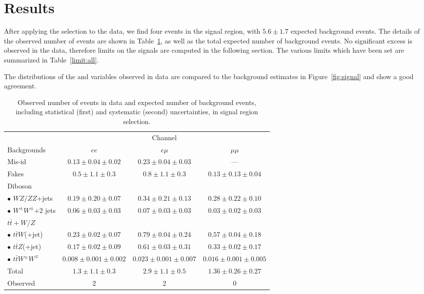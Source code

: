 \section{Results}\label{sect:results}
After applying the selection to the data, we find four events in the signal region, with $5.6\pm1.7$ expected background events. 
The details of the observed number of events are shown in Table~\ref{finalyield}, as well as the total expected number of background events. 
No significant excess is observed in the data, therefore limits on the signals are computed in the following section.
The various limits which have been set are summarized in Table~\ref{limit:all}.

The distributions of the \met{} and \HT{} variables observed in data are compared to the background estimates in Figure~\ref{fig:signal} and show a good agreement.

\begin{table}[t]
  \begin{center}
    \caption{Observed number of events in data and expected number of background events, including statistical (first) and systematic (second) uncertainties, in signal region selection.}\label{finalyield}
    \begin{tabular}{l|c|c|c}
      \hline\hline
       & \multicolumn{3}{c}{Channel} \\
      \cline{2-4}
      Backgrounds & $ee$ & $e\mu$ & $\mu\mu$ \\
      \hline
      Mis-id & $0.13\pm 0.04 \pm 0.02$ & $0.23\pm 0.04 \pm 0.03$ & --- \\
      Fakes & $0.5\pm 1.1 \pm 0.3$ & $0.8\pm 1.1 \pm 0.3$ & $0.13\pm 0.13\pm 0.04$ \\
      \hline
      Diboson & & & \\
      $\bullet$ $WZ/ZZ$+jets & $0.19\pm 0.20 \pm 0.07$ & $0.34\pm 0.21\pm 0.13$ & $0.28\pm 0.22\pm 0.10$ \\
      $\bullet$ $W^{\pm}W^\pm$+2 jets & $0.06\pm 0.03\pm 0.03$ & $0.07\pm 0.03\pm 0.03$ & $0.03\pm 0.02\pm 0.03$ \\
      \hline
      $t\bar{t}+W/Z$ & & & \\
      $\bullet$ $t\bar{t}W$(+jet) & $0.23\pm 0.02\pm 0.07$ & $0.79\pm 0.04\pm 0.24$ & $0.57\pm 0.04\pm 0.18$ \\
      $\bullet$ $t\bar{t}Z$(+jet) & $0.17\pm 0.02\pm 0.09$ & $0.61\pm 0.03\pm 0.31$ & $0.33\pm 0.02\pm 0.17$ \\
      $\bullet$ $t\bar{t}W^{\pm}W^\mp$ & $0.008\pm 0.001\pm 0.002$ & $0.023\pm 0.001\pm 0.007$ & $0.016\pm 0.001\pm 0.005$ \\
      \hline
      Total & $1.3 \pm 1.1 \pm 0.3$ & $2.9 \pm 1.1 \pm 0.5$ & $1.36 \pm 0.26 \pm 0.27$ \\
      \hline
      Observed & 2 & 2 & 0 \\
      \hline
    \end{tabular}
  \end{center}
\end{table}
\clearpage
\newpage


